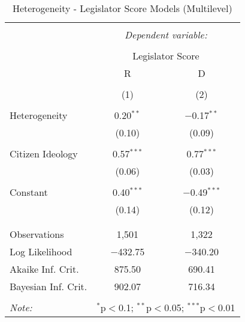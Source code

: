 
\begin{table}[!htbp] \centering 
  \caption{Heterogeneity - Legislator Score Models (Multilevel)} 
  \label{st.het.mlm.models} 
\begin{tabular}{@{\extracolsep{5pt}}lcc} 
\\[-1.8ex]\hline 
\hline \\[-1.8ex] 
 & \multicolumn{2}{c}{\textit{Dependent variable:}} \\ 
\cline{2-3} 
\\[-1.8ex] & \multicolumn{2}{c}{Legislator Score} \\ 
 & R & D \\ 
\\[-1.8ex] & (1) & (2)\\ 
\hline \\[-1.8ex] 
 Heterogeneity & 0.20$^{**}$ & $-$0.17$^{**}$ \\ 
  & (0.10) & (0.09) \\ 
  & & \\ 
 Citizen Ideology & 0.57$^{***}$ & 0.77$^{***}$ \\ 
  & (0.06) & (0.03) \\ 
  & & \\ 
 Constant & 0.40$^{***}$ & $-$0.49$^{***}$ \\ 
  & (0.14) & (0.12) \\ 
  & & \\ 
\hline \\[-1.8ex] 
Observations & 1,501 & 1,322 \\ 
Log Likelihood & $-$432.75 & $-$340.20 \\ 
Akaike Inf. Crit. & 875.50 & 690.41 \\ 
Bayesian Inf. Crit. & 902.07 & 716.34 \\ 
\hline 
\hline \\[-1.8ex] 
\textit{Note:}  & \multicolumn{2}{r}{$^{*}$p$<$0.1; $^{**}$p$<$0.05; $^{***}$p$<$0.01} \\ 
\end{tabular} 
\end{table} 
